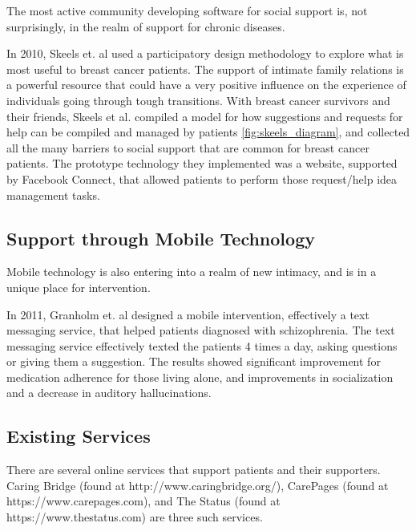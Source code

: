     The most active community developing software for social support is,
    not surprisingly, in the realm of support for chronic diseases.

    In 2010, Skeels et. al used a participatory design methodology to explore what is most useful
    to breast cancer patients.
    The support of intimate family relations is a powerful
    resource that could
    have a very positive influence on the experience of individuals going through
    tough transitions.
    With breast cancer survivors and their friends, Skeels et al. compiled a model for how
    suggestions and requests for help can be compiled and managed by patients \ref{fig:skeels_diagram},
    and collected all the many barriers to social support that are common for breast cancer patients.
    The prototype technology they implemented was a website, supported by Facebook Connect,
    that allowed patients to perform those request/help idea management tasks.
    
  \subsection{Support through Mobile Technology}
    Mobile technology is also entering into a realm of new intimacy,
    and is in a unique place for intervention.

    In 2011, Granholm et. al designed a mobile intervention,
    effectively a text messaging service, that helped patients diagnosed with
    schizophrenia.
    The text messaging service effectively texted the patients 4 times a day,
    asking questions or giving them a suggestion.
    The results showed significant improvement for medication adherence for those living alone,
    and improvements in socialization and a decrease in auditory hallucinations. \cite{granholm_12}

  \subsection{Existing Services}
    There are several online services that support patients and their supporters.
    Caring Bridge (found at http://www.caringbridge.org/),
    CarePages (found at https://www.carepages.com),
    and The Status (found at https://www.thestatus.com) are three such services.
